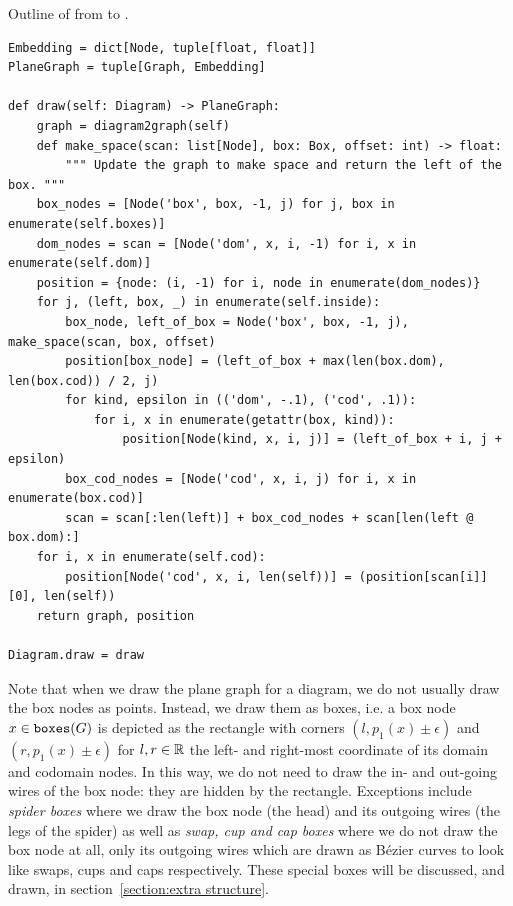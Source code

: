 \begin{python}
{\normalfont Outline of  from  to .}

\begin{verbatim}
Embedding = dict[Node, tuple[float, float]]
PlaneGraph = tuple[Graph, Embedding]

def draw(self: Diagram) -> PlaneGraph:
    graph = diagram2graph(self)
    def make_space(scan: list[Node], box: Box, offset: int) -> float:
        """ Update the graph to make space and return the left of the box. """
    box_nodes = [Node('box', box, -1, j) for j, box in enumerate(self.boxes)]
    dom_nodes = scan = [Node('dom', x, i, -1) for i, x in enumerate(self.dom)]
    position = {node: (i, -1) for i, node in enumerate(dom_nodes)}
    for j, (left, box, _) in enumerate(self.inside):
        box_node, left_of_box = Node('box', box, -1, j), make_space(scan, box, offset)
        position[box_node] = (left_of_box + max(len(box.dom), len(box.cod)) / 2, j)
        for kind, epsilon in (('dom', -.1), ('cod', .1)):
            for i, x in enumerate(getattr(box, kind)):
                position[Node(kind, x, i, j)] = (left_of_box + i, j + epsilon)
        box_cod_nodes = [Node('cod', x, i, j) for i, x in enumerate(box.cod)]
        scan = scan[:len(left)] + box_cod_nodes + scan[len(left @ box.dom):]
    for i, x in enumerate(self.cod):
        position[Node('cod', x, i, len(self))] = (position[scan[i]][0], len(self))
    return graph, position

Diagram.draw = draw
\end{verbatim}
\end{python}

Note that when we draw the plane graph for a diagram, we do not usually draw the box nodes as points.
Instead, we draw them as boxes, i.e. a box node $x \in \mathtt{boxes}(G)$ is depicted as the rectangle with corners $(l, p_1(x) \pm \epsilon)$ and $(r, p_1(x) \pm \epsilon)$ for $l, r \in \mathbb{R}$ the left- and right-most coordinate of its domain and codomain nodes.
In this way, we do not need to draw the in- and out-going wires of the box node: they are hidden by the rectangle.
Exceptions include \emph{spider boxes} where we draw the box node (the head) and its outgoing wires (the legs of the spider) as well as \emph{swap, cup and cap boxes} where we do not draw the box node at all, only its outgoing wires which are drawn as Bézier curves to look like swaps, cups and caps respectively.
These special boxes will be discussed, and drawn, in section~\ref{section:extra structure}.

